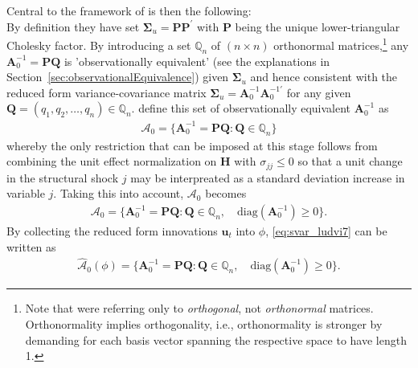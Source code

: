 \documentclass[a4paper,11pt,listof=nochaptergap,oneside,pointednumbers,bibtotoc,bigheadings,liststotoc]{scrbook}
\theoremstyle{mysatz}
\theoremstyle{mydefinition}
\theoremstyle{mytheorem}
\theoremstyle{mybemerkung}
\let\oldhat\hat
\newcommand{\vect}[1]{\boldsymbol{\mathbf{#1}}}
\newcommand{\hatt}[1]{\oldhat{\boldsymbol{\mathbf{#1}}}}
\begin{document}
Central to the framework of \citet{ludvigsonetal:18} is then the following: \\
By definition they have set $\vect{\Sigma}_u = \vect{P}\vect{P}^'$ with $\vect{P}$ being the unique lower-triangular Cholesky factor. By introducing a set $\mathbb{Q}_n$ of $(n \times n)$ orthonormal matrices,\footnote{Note that \citet{rubioetal:10} were referring only to \textit{orthogonal}, not \textit{orthonormal} matrices. Orthonormality implies orthogonality, i.e., orthonormality is stronger by demanding for each basis vector spanning the respective space to have length 1.} any $\vect{A}_0^{-1} = \vect{P}\vect{Q}$ is 'observationally equivalent' (see the explanations in Section~\ref{sec:observationalEquivalence}) given $\vect{\Sigma}_u$ and hence consistent with the reduced form variance-covariance matrix $\vect{\Sigma}_u = \vect{A}_0^{-1}\vect{A}_0^{-1'}$ for any given $\vect{Q} = (q_1, q_2, \dots, q_n) \in \mathbb{Q}_n$. \citet{ludvigsonetal:18} define this set of observationally equivalent $\vect{A}_0^{-1}$ as 
\begin{equation} \label{eq:svar_ludvi6}
\begin{split}
 			\mathcal{A}_0 = \{\vect{A}_0^{-1} = \vect{P}\vect{Q}: \vect{Q} \in \mathbb{Q}_n\}
\end{split}								
\end{equation}
whereby the only restriction that can be imposed at this stage follows from combining the unit effect normalization on $\vect{H}$ with $\sigma_{jj} \leq 0$ so that a unit change in the structural shock $j$ may be interpreated as a standard deviation increase in variable $j$. Taking this into account, $\mathcal{A}_0$ becomes
\begin{equation} \label{eq:svar_ludvi7}
\begin{split}
 			\vect{\mathcal{A}}_0 = \{\vect{A}_0^{-1} = \vect{P}\vect{Q}: \vect{Q} \in \mathbb{Q}_n, \quad \text{diag}(\vect{A}_0^{-1}) \geq 0\}.
\end{split}								
\end{equation}
By collecting the reduced form innovations $\vect{u}_t$ into $\phi$, \ref{eq:svar_ludvi7} can be written as 
\begin{equation} \label{eq:svar_ludvi8}
\begin{split}
 			\hatt{\mathcal{A}}_0(\phi) = \{\vect{A}_0^{-1} = \vect{P}\vect{Q}: \vect{Q} \in \mathbb{Q}_n, \quad \text{diag}(\vect{A}_0^{-1}) \geq 0\}.
\end{split}								
\end{equation}
\end{document}
